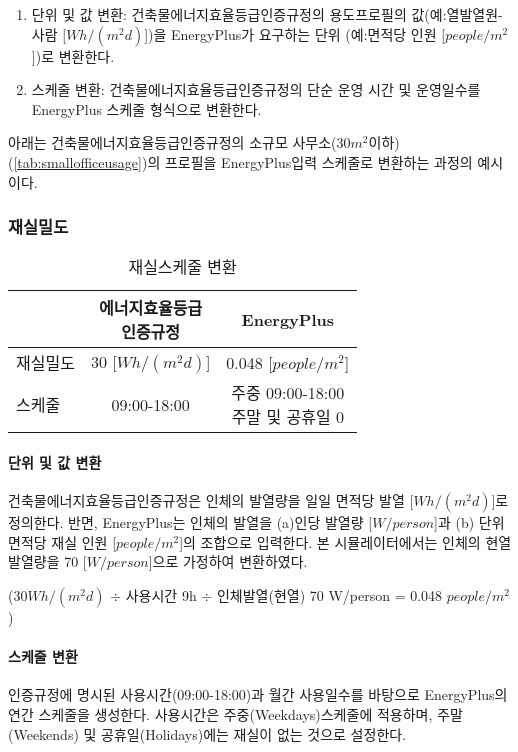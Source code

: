 \begin{enumerate}
  \item 단위 및 값 변환: 건축물에너지효율등급인증규정의 용도프로필의 값(예:열발열원-사람 [$Wh/(m^2d)$])을 EnergyPlus가 요구하는 단위 (예:면적당 인원 [$people/m^2$])로 변환한다.
  \item 스케줄 변환: 건축물에너지효율등급인증규정의 단순 운영 시간 및 운영일수를 EnergyPlus 스케줄 형식으로 변환한다.
\end{enumerate}

아래는 건축물에너지효율등급인증규정의 소규모 사무소(30$m^2$이하)(\cref{tab:smallofficeusage})의 프로필을 EnergyPlus입력 스케줄로 변환하는 과정의 예시이다.

\subsubsection{재실밀도}
\begin{table}[ht]
  \caption{재실스케줄 변환}
  \centering
  \begin{tabular}{lcc}
    \toprule
     & \makecell{에너지효율등급\\인증규정} & EnergyPlus\\ \midrule
    재실밀도 &  30 [$Wh/(m^2d)$] & 0.048 [$people/m^2$] \\ \midrule
    스케줄  &  09:00-18:00      & \makecell{주중 09:00-18:00\\ 주말 및 공휴일 0} \\ \midrule
  \end{tabular}
\end{table}

\paragraph{단위 및 값 변환} 건축물에너지효율등급인증규정은 인체의 발열량을 일일 면적당 발열 [$Wh/(m^2d)$]로 정의한다. 반면, EnergyPlus는 인체의 발열을 (a)인당 발열량 [$W/person$]과 (b) 단위 면적당 재실 인원 [$people/m^2$]의 조합으로 입력한다. 본 시뮬레이터에서는 인체의 현열 발열량을 70 [$W/person$]으로 가정하여 변환하였다.\par
  (30$Wh/(m^2d)$ $\div$ 사용시간 9h $\div$ 인체발열(현열) 70 W/person = 0.048 $people/m^2$)
\paragraph{스케줄 변환} 인증규정에 명시된 사용시간(09:00-18:00)과 월간 사용일수를 바탕으로 EnergyPlus의 연간 스케줄을 생성한다. 사용시간은 주중(Weekdays)스케줄에 적용하며, 주말(Weekends) 및 공휴일(Holidays)에는 재실이 없는 것으로 설정한다.


